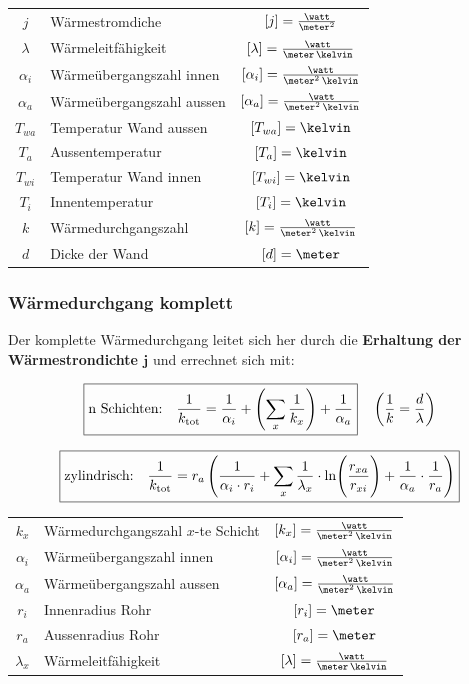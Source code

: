 \renewcommand{\arraystretch}{1.3}
\begin{tabular}{c l c}
	$j$ 						& Wärmestromdiche 			& $[j] = \frac{\watt}{\meter^2}$ 								\\
	$\lambda$ 					& Wärmeleitfähigkeit 		& $[\lambda] = \frac{\watt}{\meter \, \kelvin}$ 				\\
	$\alpha_i$ 					& Wärmeübergangszahl innen 	& $[\alpha_i] = \frac{\watt}{\meter^2 \, \kelvin}$				\\
	$\alpha_a$ 					& Wärmeübergangszahl aussen & $[\alpha_a] = \frac{\watt}{\meter^2 \, \kelvin}$				\\
	$T_{wa}$ 					& Temperatur Wand aussen 	& $[T_{wa}] = \kelvin$ 											\\
	$T_a$ 						& Aussentemperatur 			& $[T_a] = \kelvin$ 											\\
	$T_{wi}$ 					& Temperatur Wand innen 	& $[T_{wi}] = \kelvin$ 											\\
	$T_i$ 						& Innentemperatur 			& $[T_i] = \kelvin$ 											\\
	$k$ 						& Wärmedurchgangszahl 		& $[k] = \frac{\watt}{\meter^2 \, \kelvin}$						\\
	$d$ 						& Dicke der Wand 			& $[d] = \meter$
\end{tabular}
\renewcommand{\arraystretch}{1}


\subsubsection{Wärmedurchgang komplett}

Der komplette Wärmedurchgang leitet sich her durch die \textbf{Erhaltung der Wärmestrondichte $\bm{j}$} und errechnet sich mit:

$$ \boxed{\text{n Schichten:} \quad \frac{1}{k_{\rm tot}} = \frac{1}{\alpha_i} + \left(\sum_x  \frac{1}{k_x}\right) + \frac{1}{\alpha_a} } \quad \left(\frac{1}{k} = \frac{d}{\lambda}\right) $$

$$ \boxed{\text{zylindrisch:} \quad \frac{1}{k_{\rm tot}} = r_a \left( \frac{1}{\alpha_i \cdot r_i} + \sum_x \frac{1}{\lambda_x} \cdot \ln \Biggl( \frac{r_{xa}}{r_{xi}} \Biggr) + \frac{1}{\alpha_a} \cdot \frac{1}{r_a}\right) } $$


\renewcommand{\arraystretch}{1.3}
\begin{tabular}{c l c}
	$k_x$ 		& Wärmedurchgangszahl $x$-te Schicht 	& $[k_x] = \frac{\watt}{\meter^2 \, \kelvin}$ 		\\
	$\alpha_i$ 	& Wärmeübergangszahl innen 				& $[\alpha_i] = \frac{\watt}{\meter^2 \, \kelvin}$	\\
	$\alpha_a$ 	& Wärmeübergangszahl aussen 			& $[\alpha_a] = \frac{\watt}{\meter^2 \, \kelvin}$ 	\\
	$r_i$ 		& Innenradius Rohr 						& $[r_i] = \meter$									\\
	$r_a$ 		& Aussenradius Rohr 					& $[r_a] = \meter$									\\
	$\lambda_x$ & Wärmeleitfähigkeit 					& $[\lambda] = \frac{\watt}{\meter \, \kelvin}$
\end{tabular}
\renewcommand{\arraystretch}{1}


